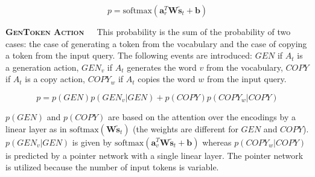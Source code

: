 \[p = \text{softmax}(\textbf{a}_{r}^{T}\textbf{W}\tilde{\textbf{s}}_{t} + \textbf{b})\]

\textbf{\textsc{GenToken Action}}\ \ \ This probability is the sum of the
probability of two cases: the case of generating a token from the vocabulary
and the case of copying a token from the input query. The following events are
introduced: \(GEN\) if \(A_{t}\) is a generation action, \(GEN_{v}\) if \(A_{t}\)
generates the word \(v\) from the vocabulary, \(COPY\) if \(A_{t}\) is a copy
action, \(COPY_{w}\) if \(A_{t}\) copies the word \(w\) from the input query.

\[p = p(GEN)p(GEN_{v}|GEN) + p(COPY)p(COPY_{w}|COPY)\]

\(p(GEN)\) and \(p(COPY)\) are based on the attention over the encodings by
a linear layer as in \(\text{softmax}(\textbf{W}\tilde{\textbf{s}}_{t})\)
(the weights are different for \(GEN\) and \(COPY\)). \(p(GEN_{v}|GEN)\) is
given by \(\text{softmax}(\textbf{a}_{v}^{T}\textbf{W}\tilde{\textbf{s}}_{t}
+ \textbf{b})\) whereas \(p(COPY_{w}|COPY)\) is predicted by a pointer network
\cite{VinyalsFortunatoJaitly2015} with a single linear layer.
The pointer network is utilized because the number of input tokens is variable.